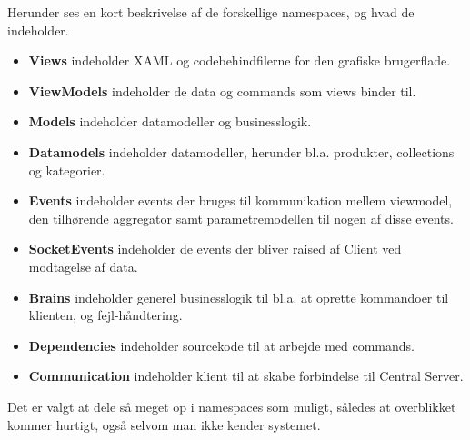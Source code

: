 Herunder ses en kort beskrivelse af de forskellige namespaces, og hvad de indeholder.

\begin{itemize}
\item \textbf{Views} indeholder XAML og codebehindfilerne for den grafiske brugerflade. 
\item \textbf{ViewModels} indeholder de data og commands som views binder til. 
\item \textbf{Models} indeholder datamodeller og businesslogik.
\item \textbf{Datamodels} indeholder datamodeller, herunder bl.a. produkter, collections og kategorier.
\item \textbf{Events} indeholder events der bruges til kommunikation mellem viewmodel, den tilhørende aggregator samt parametremodellen til nogen af disse events.
\item \textbf{SocketEvents} indeholder de events der bliver raised af Client ved modtagelse af data.
\item \textbf{Brains} indeholder generel businesslogik til bl.a. at oprette kommandoer til klienten, og fejl-håndtering.
\item \textbf{Dependencies} indeholder sourcekode til at arbejde med commands.
\item \textbf{Communication} indeholder klient til at skabe forbindelse til Central Server.
\end{itemize}

Det er valgt at dele så meget op i namespaces som muligt, således at overblikket kommer hurtigt, også selvom man ikke kender systemet. 

